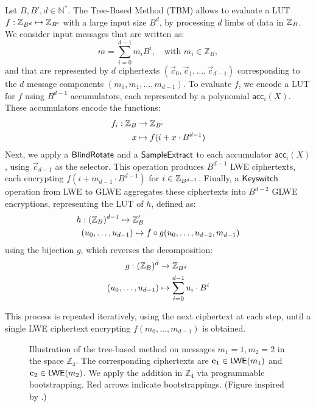 Let $B, B', d \in \mathbb N^*$. The Tree-Based Method (TBM) allows to evaluate a LUT $f: \mathbb{Z}_{B^d} \mapsto \mathbb{Z}_ {B'}$ with a large input size $B^d$, by processing $d$ limbs of data in $\mathbb{Z}_B$. We consider input messages that are written as:
$$
    m = \sum_{i=0}^{d-1} m_i B^i, \quad \text{with } m_i \in \mathbb{Z}_B,
$$
and that are represented by $d$ ciphertexts $(\vec c_0, \vec c_1, \dots, \vec c_{d-1})$ corresponding to the $d$ message components $(m_0, m_1, \dots, m_{d-1})$. 
%
To evaluate $f$, we encode a LUT for $f$ using $B^{d-1}$ accumulators, each represented by a polynomial $\textsf{acc}_i(X)$. These accumulators encode the functions:
%
    \begin{align*}
        f_i: \mathbb{Z}_B &\rightarrow \mathbb{Z}_{B'}\\
             x &\mapsto f(i + x \cdot B^{d-1})
    \end{align*}
%
Next, we apply a $\sf{BlindRotate}$ and a $\sf{SampleExtract}$ to each accumulator $\textsf{acc}_i(X)$, using $\vec c_{d-1}$ as the selector. This operation produces $B^{d-1}$ LWE ciphertexts, each encrypting $f (i + m_{d-1} \cdot B^{d-1})$ for $i \in \mathbb{Z}_{B^{d-1}}$.
%    
Finally, a $\sf{Keyswitch}$ operation from LWE to GLWE aggregates these ciphertexts into $B^{d-2}$ GLWE encryptions, representing the LUT of $h$, defined as:
    \begin{align*}
        h &: (\mathbb{Z}_{B})^{d-1} \mapsto \mathbb{Z}_B' \\
          & (u_0, \dots, u_{d-1}) \mapsto f \circ g(u_0, \dots, u_{d-2}, m_{d-1})
    \end{align*}
using the bijection $g$, which reverses the decomposition:
    \begin{align*}
        g: (\mathbb{Z}_B)^d &\rightarrow \mathbb{Z}_{B^d} \\
           (u_0, \dots, u_{d-1}) &\mapsto \sum_{i=0}^{d-1} u_i \cdot B^i
    \end{align*} 

This process is repeated iteratively, using the next ciphertext at each step, until a single LWE ciphertext encrypting $f(m_0, \dots, m_{d-1})$ is obtained.  


\begin{figure}
    \centering
    \treePBSFigure
    \caption{Illustration of the tree-based method on messages  $m_1 = 1, m_2=2$ in the space  $\mathbb{Z}_4$. The corresponding ciphertexts are $\mathbf c_1 \in \textsf{LWE}(m_1)$ and $\mathbf c_2 \in \textsf{LWE}(m_2)$. We apply the addition in $\mathbb{Z}_4$ via programmable bootstrapping. Red arrows indicate bootstrappings. (Figure inspired by \cite{DBLP:conf/wahc/TramaCBS23}.)}
    \label{fig:my_label}
\end{figure}

